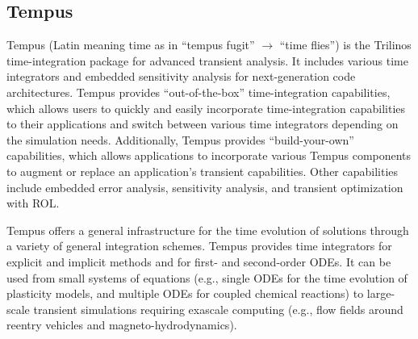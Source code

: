 \subsection{Tempus}
Tempus (Latin meaning time as in “tempus fugit” $\rightarrow$ “time flies”)
is the Trilinos time-integration package for advanced transient
analysis.  It includes various time integrators and embedded
sensitivity analysis for next-generation code architectures.  Tempus
provides “out-of-the-box” time-integration capabilities, which
allows users to quickly and easily incorporate time-integration
capabilities to their applications and switch between various time
integrators depending on the simulation needs.  Additionally, Tempus
provides “build-your-own” capabilities, which allows applications
to incorporate various Tempus components to augment or replace
an application's transient capabilities. Other capabilities include
embedded error analysis, sensitivity analysis, and transient optimization
with ROL.

Tempus offers a general infrastructure for the time evolution of
solutions through a variety of general integration schemes.  Tempus
provides time integrators for explicit and implicit methods and for
first- and second-order ODEs.  It can be used from small systems of
equations (e.g., single ODEs for the time evolution of plasticity
models, and multiple ODEs for coupled chemical reactions) to
large-scale transient simulations requiring exascale computing
(e.g., flow fields around reentry vehicles and magneto-hydrodynamics).

